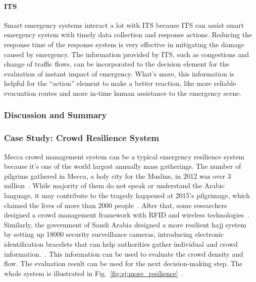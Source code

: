 \documentclass[letterpaper, twocolumn, 10pt, conference]{IEEEtran}
\begin{document}
\paragraph{ITS}

Smart emergency systems interact a lot with ITS because ITS can assist smart emergency system with timely data collection and response actions. Reducing the response time of the response system is very effective in mitigating the damage caused by emergency. The information provided by ITS, such as congestions and change of traffic flows, can be incorporated to the decision element for the evaluation of instant impact of emergency. What’s more, this information is helpful for the \enquote{action} element to make a better reaction, like more reliable evacuation routes and more in-time human assistance to the emergency scene.

\subsubsection{Discussion and Summary}
\label{sssec:css:smart_response_system:discussion}
\subsubsection{Case Study: Crowd Resilience System}


Mecca crowd management system can be a typical emergency resilience system because it’s one of the world largest annually mass gatherings. The number of pilgrims gathered in Mecca, a holy city for the Muslins, in 2012 was over 3 million~\cite{alnabulsi2014social}. While majority of them do not speak or understand the Arabic language, it may contribute to the tragedy happened at 2015’s pilgrimage, which claimed the lives of more than 2000 people~\cite{yang2017using}. After that, some researchers designed a crowd management framework with RFID and wireless technologies~\cite{yamin2009crowd}. Similarly, the government of Saudi Arabia designed a more resilient hajj system by setting up 18000 security surveillance cameras, introducing electronic identification bracelets that can help authorities gather individual and crowd information.~\cite{yang2017using}. This information can be used to evaluate the crowd density and flow. The evaluation result can be used for the next decision-making step. The whole system is illustrated in Fig.~\ref{fig:zj:more_resilience}~\cite{yang2017using}.
\end{document}
